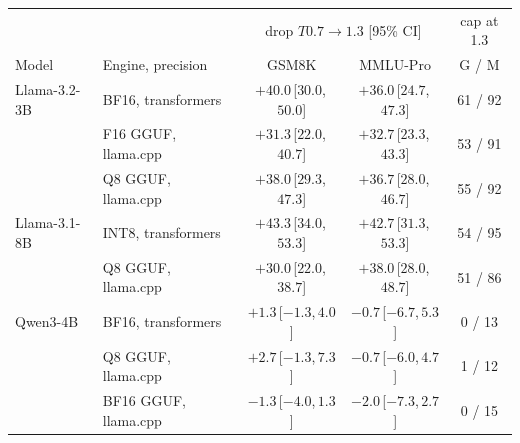 \begin{tabular}{llccc}
\toprule
 & & \multicolumn{2}{c}{drop $T0.7 \to 1.3$ [95\% CI]} & cap at 1.3 \\
Model & Engine, precision & GSM8K & MMLU-Pro & G / M \\
\midrule
Llama-3.2-3B & BF16, transformers & $+40.0$\,[$30.0$,\,$50.0$] & $+36.0$\,[$24.7$,\,$47.3$] & 61 / 92 \\
 & F16 GGUF, llama.cpp & $+31.3$\,[$22.0$,\,$40.7$] & $+32.7$\,[$23.3$,\,$43.3$] & 53 / 91 \\
 & Q8 GGUF, llama.cpp & $+38.0$\,[$29.3$,\,$47.3$] & $+36.7$\,[$28.0$,\,$46.7$] & 55 / 92 \\
\midrule
Llama-3.1-8B & INT8, transformers & $+43.3$\,[$34.0$,\,$53.3$] & $+42.7$\,[$31.3$,\,$53.3$] & 54 / 95 \\
 & Q8 GGUF, llama.cpp & $+30.0$\,[$22.0$,\,$38.7$] & $+38.0$\,[$28.0$,\,$48.7$] & 51 / 86 \\
\midrule
Qwen3-4B & BF16, transformers & $+1.3$\,[$-1.3$,\,$4.0$] & $-0.7$\,[$-6.7$,\,$5.3$] & 0 / 13 \\
 & Q8 GGUF, llama.cpp & $+2.7$\,[$-1.3$,\,$7.3$] & $-0.7$\,[$-6.0$,\,$4.7$] & 1 / 12 \\
 & BF16 GGUF, llama.cpp & $-1.3$\,[$-4.0$,\,$1.3$] & $-2.0$\,[$-7.3$,\,$2.7$] & 0 / 15 \\
\bottomrule
\end{tabular}
